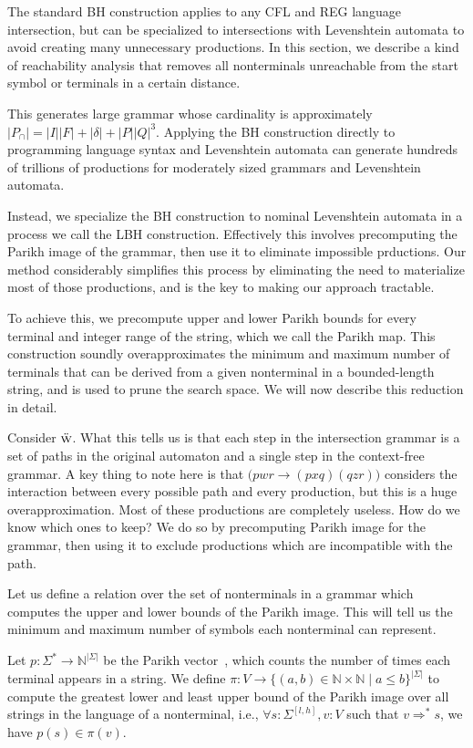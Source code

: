 \documentclass[sigplan,review,anonymous,acmsmall]{acmart}\settopmatter{printfolios=false,printccs=false,printacmref=false}
\begin{document}
  The standard BH construction applies to any CFL and REG language intersection, but can be specialized to intersections with Levenshtein automata to avoid creating many unnecessary productions. In this section, we describe a kind of reachability analysis that removes all nonterminals unreachable from the start symbol or terminals in a certain distance.

  This generates large grammar whose cardinality is approximately $|P_\cap|=|I||F| + |\delta| + |P||Q|^3$. Applying the BH construction directly to programming language syntax and Levenshtein automata can generate hundreds of trillions of productions for moderately sized grammars and Levenshtein automata.

  Instead, we specialize the BH construction to nominal Levenshtein automata in a process we call the LBH construction. Effectively this involves precomputing the Parikh image of the grammar, then use it to eliminate impossible prductions. Our method considerably simplifies this process by eliminating the need to materialize most of those productions, and is the key to making our approach tractable.

  To achieve this, we precompute upper and lower Parikh bounds for every terminal and integer range of the string, which we call the Parikh map. This construction soundly overapproximates the minimum and maximum number of terminals that can be derived from a given nonterminal in a bounded-length string, and is used to prune the search space. We will now describe this reduction in detail.

  Consider $\textsc{\"w}$. What this tells us is that each step in the intersection grammar is a set of paths in the original automaton and a single step in the context-free grammar. A key thing to note here is that $\big(pwr\rightarrow (pxq)(qzr)\big)$ considers the interaction between every possible path and every production, but this is a huge overapproximation. Most of these productions are completely useless. How do we know which ones to keep? We do so by precomputing Parikh image for the grammar, then using it to exclude productions which are incompatible with the path.

  Let us define a relation over the set of nonterminals in a grammar which computes the upper and lower bounds of the Parikh image. This will tell us the minimum and maximum number of symbols each nonterminal can represent.

  \begin{definition}
    Let $p: \Sigma^*\rightarrow\mathbb{N}^{|\Sigma|}$ be the Parikh vector~\cite{parikh1966context}, which counts the number of times each terminal appears in a string. We define $\pi: V \rightarrow \{(a, b) \in \mathbb{N} \times \mathbb{N} \mid a \leq b\}^{|\Sigma|}$ to compute the greatest lower and least upper bound of the Parikh image over all strings in the language of a nonterminal, i.e., $\forall s: \Sigma^{[l, h]}, v: V$ such that $v \Rightarrow^* s$, we have $p(s) \in \pi(v)$.
  \end{definition}
\end{document}
